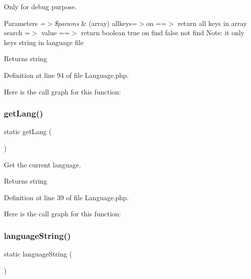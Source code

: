 Only for debug purpose.


\begin{DoxyParams}{Parameters}
{\em =$>$\$params} & (array) \textquotesingle{}allkeys\textquotesingle{}=$>$\textquotesingle{}on\textquotesingle{} ==$>$ return all keys in array \textquotesingle{}search\textquotesingle{} =$>$ \textquotesingle{}value\textquotesingle{} ==$>$ return boolean true on find false not find Note\+: it only keys string in language file\\
\hline
\end{DoxyParams}
\begin{DoxyReturn}{Returns}
string 
\end{DoxyReturn}


Definition at line 94 of file Language.\+php.

Here is the call graph for this function\+:
\mbox{\label{class_zest_1_1_language_1_1_language_a077fea27c088bf2ea25704aab2f715dd}} 
\subsubsection{\texorpdfstring{get\+Lang()}{getLang()}}
{\footnotesize\ttfamily static get\+Lang (\begin{DoxyParamCaption}{ }\end{DoxyParamCaption})\hspace{0.3cm}{\ttfamily [static]}}

Get the current language.

\begin{DoxyReturn}{Returns}
string 
\end{DoxyReturn}


Definition at line 39 of file Language.\+php.

Here is the call graph for this function\+:
\mbox{\label{class_zest_1_1_language_1_1_language_ae6e8660c2e4445fe371b17c64915ef7a}} 
\subsubsection{\texorpdfstring{language\+String()}{languageString()}}
{\footnotesize\ttfamily static language\+String (\begin{DoxyParamCaption}{ }\end{DoxyParamCaption})\hspace{0.3cm}{\ttfamily [static]}}


